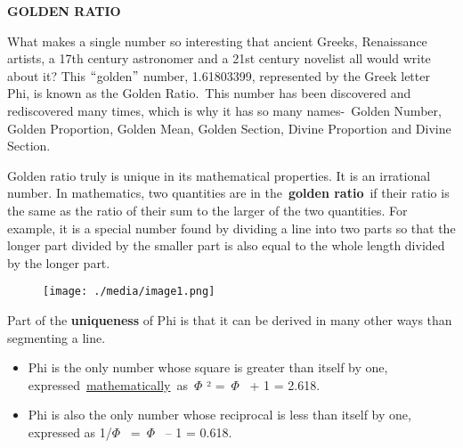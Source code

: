 \documentclass[12pt]{article}
\begin{document}
\setlength{\parskip}{0.0pt}
{\fontsize{10pt}{12.0pt}\selectfont \textbf{GOLDEN RATIO}\par}\par

{\fontsize{10pt}{12.0pt}\selectfont What makes a single number so interesting that ancient Greeks, Renaissance artists, a 17th century astronomer and a 21st century novelist all would write about it? This $``$golden$"$  number, 1.61803399, represented by the Greek letter Phi, is known as the Golden Ratio. This number has been discovered and rediscovered many times, which is why it has so many names- Golden Number, Golden Proportion, Golden Mean, Golden Section, Divine Proportion and Divine Section.  \par}\par

{\fontsize{10pt}{12.0pt}\selectfont Golden ratio truly is unique in its mathematical properties. It is an irrational number. In mathematics, two quantities are in the \textbf{golden ratio} if their ratio is the same as the ratio of their sum to the larger of the two quantities. For example, it is a special number found by dividing a line into two parts so that the longer part divided by the smaller part is also equal to the whole length divided by the longer part. \par}\par




\begin{figure}[H]
	\begin{Center}
		\texttt{[image: ./media/image1.png]}
	\end{Center}
\end{figure}



\par

{\fontsize{10pt}{12.0pt}\selectfont Part of the \textbf{uniqueness} of Phi is that it can be derived in many other ways than segmenting a line. \par}\par

\begin{itemize}
	\item {\fontsize{10pt}{12.0pt}\selectfont Phi is the only number whose square is greater than itself by one, expressed \href{https://www.goldennumber.net/math/}{mathematically} as $ \Phi $ ² = $ \Phi $  + 1 = 2.618. \par}\par

	\item {\fontsize{10pt}{12.0pt}\selectfont Phi is also the only number whose reciprocal is less than itself by one, expressed as 1/$ \Phi $  = $ \Phi $  – 1 = 0.618. \par}
\end{itemize}\par
\end{document}
